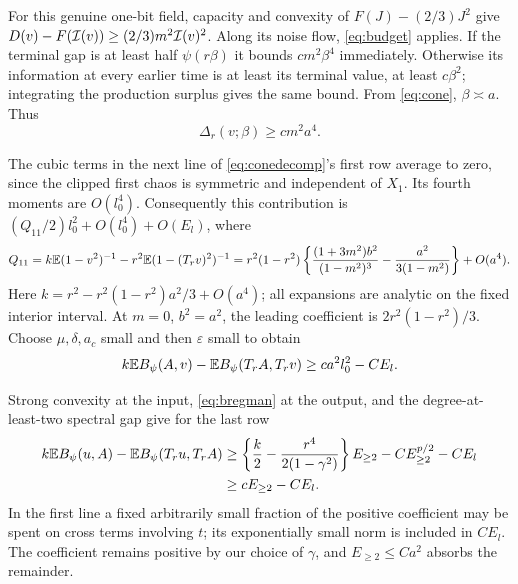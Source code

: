 For this genuine one-bit field, capacity and convexity of
$F(J)-(2/3)J^2$ give
$D(v)-F(\mathcal I(v))\ge(2/3)m^2\mathcal I(v)^2$.
Along its noise flow, \eqref{eq:budget} applies.
If the terminal gap is at least half $\psi(r\beta)$ it bounds
$c m^2\beta^4$ immediately. Otherwise its information at every earlier
time is at least its terminal value, at least $c\beta^2$;
integrating the production surplus gives the same bound.
From \eqref{eq:cone}, $\beta\asymp a$. Thus
\begin{equation}\label{eq:onebitpay}
 \Delta_r(v;\beta)\ge c m^2a^4.
\end{equation}

The cubic terms in the next line of \eqref{eq:conedecomp}'s first row
average to zero, since the clipped first chaos is symmetric and independent
of $X_1$. Its fourth moments are $O(l_0^4)$. Consequently this contribution
is $(Q_{11}/2)l_0^2+O(l_0^4)+O(E_l)$, where
\[
 Q_{11}=k\mathbb E(1-v^2)^{-1}-r^2\mathbb E(1-(T_rv)^2)^{-1}
 =r^2(1-r^2)\left\{\frac{(1+3m^2)b^2}{(1-m^2)^3}
                 -\frac{a^2}{3(1-m^2)}\right\}+O(a^4).
\]
Here $k=r^2-r^2(1-r^2)a^2/3+O(a^4)$; all expansions are analytic
on the fixed interior interval. At $m=0$, $b^2=a^2$, the leading
coefficient is $2r^2(1-r^2)/3$. Choose $\mu,\delta,a_c$ small and
then $\varepsilon$ small to obtain
\begin{equation}\label{eq:otherpay}
 k\mathbb E B_\psi(A,v)-\mathbb E B_\psi(T_rA,T_rv)
 \ge ca^2l_0^2-CE_l.
\end{equation}

Strong convexity at the input, \eqref{eq:bregman} at the output,
and the degree-at-least-two spectral gap give for the last row
\begin{align}
 k\mathbb E B_\psi(u,A)-\mathbb E B_\psi(T_ru,T_rA)
 &\ge\left\{\frac k2-\frac{r^4}{2(1-\gamma^2)}\right\}E_{\ge2}
       -C E_{\ge2}^{p/2}-CE_l\notag\\
 &\ge cE_{\ge2}-CE_l.\label{eq:higherpay}
\end{align}
In the first line a fixed arbitrarily small fraction of the positive
coefficient may be spent on cross terms involving $t$; its exponentially
small norm is included in $CE_l$. The coefficient remains positive by
our choice of $\gamma$, and $E_{\ge2}\le Ca^2$ absorbs the remainder.

